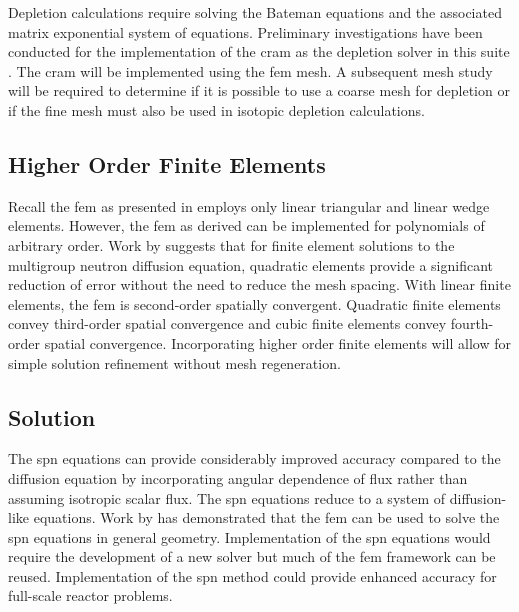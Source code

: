     Depletion calculations require solving the Bateman equations and the
    associated matrix exponential system of equations. Preliminary
    investigations have been conducted for the implementation of the \gls{cram}
    as the depletion solver in this suite \cite{cram}. The \gls{cram} will be 
    implemented using the \gls{fem} mesh. A subsequent mesh study will be
    required to determine if it is possible to use a coarse mesh for depletion
    or if the fine mesh must also be used in isotopic depletion calculations.

  \subsection{Higher Order Finite Elements}
    Recall the \gls{fem} as presented in  employs
    only linear triangular and linear wedge elements. However, the \gls{fem} as 
    derived can be implemented for polynomials of arbitrary order. Work by 
    \textcite{Hosseini2013} suggests that for finite element solutions to 
    the multigroup neutron diffusion equation, quadratic elements provide a 
    significant reduction of error without the need to reduce the mesh spacing. 
    With linear finite elements, the \gls{fem} is second-order spatially 
    convergent. Quadratic finite elements convey third-order spatial convergence 
    and cubic finite elements convey fourth-order spatial convergence. 
    Incorporating higher order finite elements will allow for simple solution 
    refinement without mesh regeneration.

  \subsection{\texorpdfstring{}{Simplified PN} Solution}
    The \gls{spn} equations can provide considerably improved accuracy compared
    to the diffusion equation by incorporating angular dependence of flux rather
    than assuming isotropic scalar flux. The \gls{spn} equations reduce to a
    system of diffusion-like equations. Work by \textcite{Ryu2013} has
    demonstrated that the \gls{fem} can be used to solve the \gls{spn} equations 
    in general geometry. Implementation of the \gls{spn} equations would
    require the development of a new solver but much of the \gls{fem} framework
    can be reused. Implementation of the \gls{spn} method could provide enhanced
    accuracy for full-scale reactor problems.

